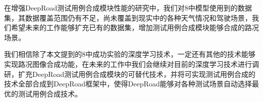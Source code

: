 \begin{conclusions}
在增强DeepRoad测试用例合成模块性能的研究中，我们对8中模型使用到的数据集，其数据覆盖范围仍有不足，尚未覆盖到现实中的各种天气情况和驾驶场景，我们希望未来的工作能够扩充已有的数据集，增加测试用例合成模块能够合成的路况场景。

我们相信除了本文提到的8中成功实验的深度学习技术，一定还有其他的技术能够实现路况图像合成功能，在未来的工作中我们会继续对目前的深度学习技术进行调研，扩充DeepRoad测试用例合成模块的可替代技术，并将可实现测试用例合成的技术全部合成到DeepRoad框架中，使得DeepRoad能够对各种测试场景自动选择最优的测试用例合成技术。

\end{conclusions}
